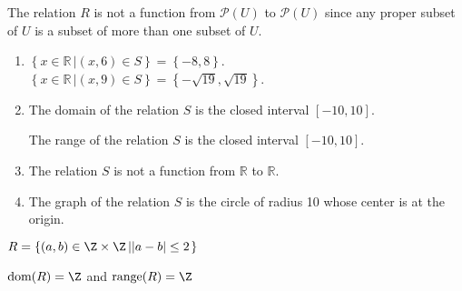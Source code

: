 \begin{list}{}
\item \begin{list}{\bf{(d)}}
\item The relation $R$ is not a function from $\mathcal{P} ( U )$ to 
$\mathcal{P} ( U )$ since any proper subset of $U$ is a subset of more than one subset of $U$.
\end{list}
\end{list}


\begin{list}{\bf{\ref{exer:circle-main}.}}
\item \begin{enumerate}
\item $\left\{ {\left. {x \in \mathbb{R}\,} \right| \left( {x, 6} \right) \in S} \right\} = \left\{ { - 8, 8} \right\}$. \\ $\left\{ {\left. {x \in \mathbb{R}\,} \right| \left( {x, 9} \right) \in S} \right\} = \left\{ { - \sqrt {19} , \sqrt {19} } \right\}$.

\item The domain of the relation $S$ is the closed interval $\left[ -10, 10 \right]$.

The range of the relation $S$ is the closed interval $\left[ -10, 10 \right]$.


\item The relation $S$ is not a function from $\mathbb{R}$ to $\mathbb{R}$.

\item The graph of the relation $S$ is the circle of radius 10 whose center is at the origin.
\end{enumerate}
\end{list}


\begin{list}{\bf{\ref{exer:absvalueless2}.}}
\item \begin{list}{\bf{(a)}}
\item $R = \left\{ (a, b) \in \Z \times \Z \left| \left| a - b \right| \leq 2 \right. \right\}$
\end{list}
\end{list}


\begin{list}{}
\item \begin{list}{\bf{(b)}}
\item $\text{dom}(R) = \Z$ and $\text{range}(R) = \Z$
\end{list}
\end{list}
\hbreak

\endinput


